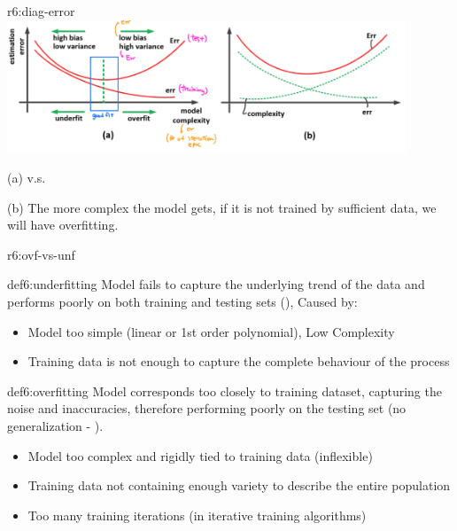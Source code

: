\documentclass{tron}
\begin{document}
\clearpage
\begin{remark}{r6:diag-error}
	 \includegraphics[width=450px]{Figs/Lec6/diag-err}
	 
	 (a)  v.s. 
	 
	 (b) The more complex the model gets, if it is not trained by sufficient data, we will have overfitting.
\end{remark}

\begin{remark}{r6:ovf-vs-unf}
	\begin{definition}[Underfitting]{def6:underfitting}
		Model fails to capture the underlying trend of the data and performs poorly on both training and testing sets (), Caused by:
		
		\begin{itemize}
			\item Model too simple (linear or 1st order polynomial), Low Complexity	
			\item Training data is not enough to capture the complete behaviour of the process
		\end{itemize}
	\end{definition}
	\begin{definition}[Overfitting]{def6:overfitting}
		Model corresponds too closely to training dataset, capturing the noise and inaccuracies, therefore performing poorly on the testing set (no generalization - ).
		\begin{itemize}
			\item Model too complex and rigidly tied to training data (inflexible)
			\item Training data not containing enough variety to describe the entire population
			\item Too many training iterations (in iterative training algorithms)
		\end{itemize}
	\end{definition}	
\end{remark}
\end{document}
